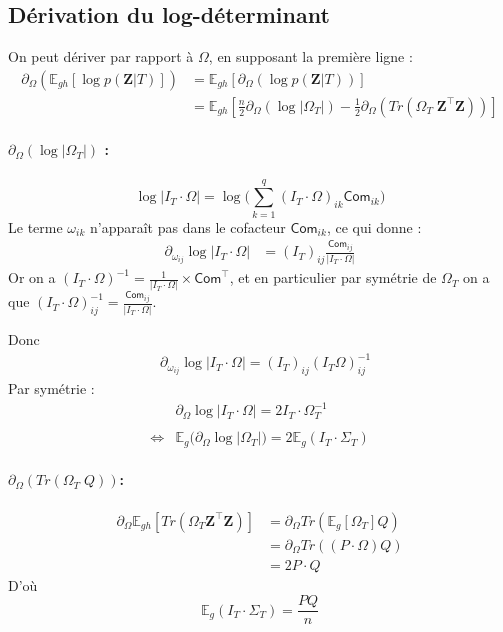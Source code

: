 \documentclass[11pt,a4paper]{article}
\newcommand{\Zbf}{\boldsymbol{Z}}
\newcommand{\Esp}{\mathds{E}}
\begin{document}
\subsection{Dérivation du log-déterminant}
On peut dériver par rapport à $\Omega$, en supposant la première ligne :
\begin{align}
    \partial_{\Omega}\left(\Esp_{gh}\left[\log p(\Zbf | T)\right] \right)&=  \Esp_{gh}\left[\partial_{\Omega}( \log p(\Zbf | T) )\right] \\
    &=\Esp_{gh}\left[\frac{n}{2}\partial_{\Omega}( \log |\Omega_T|) -\frac{1}{2} \partial_\Omega (Tr(\Omega_T \; \Zbf^\intercal \Zbf ))\right]
\end{align}

\paragraph{\underline{$\partial_{\Omega}( \log |\Omega_T|)$} :}
 $$\log |I_T \cdot \Omega| = \log \big(\sum_{k=1}^q (I_T\cdot \Omega)_{ik} \mathsf{Com}_{ik}\big)$$
Le terme $\omega_{ik}$ n'apparaît pas dans le cofacteur $\mathsf{Com}_{ik}$, ce qui donne :
\begin{align*}
    \partial_{\omega_{ij}} \log |I_T\cdot \Omega| &= (I_T)_{ij} \frac{\mathsf{Com}_{ij}}{|I_T\cdot \Omega |}
\end{align*}
Or on a $(I_T\cdot \Omega)^{-1} = \frac{1}{|I_T \cdot \Omega|}\times \mathsf{Com}^\intercal$, et en particulier par symétrie de $\Omega_T$ on a que $(I_T\cdot \Omega)_{ij}^{-1}=\frac{\mathsf{Com}_{ij}}{|I_T\cdot \Omega |}$.

Donc 
\begin{align}
         &\partial_{\omega_{ij}} \log |I_T\cdot \Omega| = (I_T)_{ij} (I_T\Omega)_{ij}^{-1}
\end{align}
Par symétrie :
\begin{align}
    &\partial_\Omega \log |I_T\cdot \Omega| = 2I_T \cdot \Omega_T^{-1}\\\\
    \iff &\Esp_g \big( \partial_\Omega \log |\Omega_T| \big) = 2\Esp_g (I_T\cdot \Sigma_T) 
\end{align}

\paragraph{\underline{$ \partial_\Omega (Tr(\Omega_T \; Q ))$}:}
\begin{align}
    \partial_\Omega \Esp_{gh}[Tr(\Omega_T \Zbf^\intercal \Zbf)]&=\partial_\Omega Tr(\Esp_g[\Omega_T]Q)\\
    &=\partial_\Omega Tr((P\cdot\Omega)Q)\\
    &=2P\cdot Q
\end{align}
D'où $$ \Esp_g (I_T\cdot \Sigma_T)  = \frac{PQ}{n}$$
\end{document}
